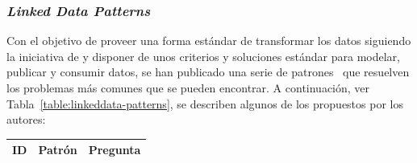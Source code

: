 \subsubsection{\textit{Linked Data Patterns}}\label{linked-data-patterns}
Con el objetivo de proveer una forma estándar de transformar los datos
siguiendo la iniciativa de \linkeddata y disponer de unos criterios y soluciones estándar
para modelar, publicar y consumir datos, se han publicado una serie de patrones~\cite{linked-data-patterns} que resuelven
los problemas más comunes que se pueden encontrar. A continuación, ver Tabla~\ref{table:linkeddata-patterns}, se describen
algunos de los propuestos por los autores:


\begin{longtable}[c]{|l|p{7cm}|p{8cm}|} 

\hline

  \textbf{ID} & \textbf{Patrón} &  \textbf{Pregunta} \\\hline


\end{longtable}
